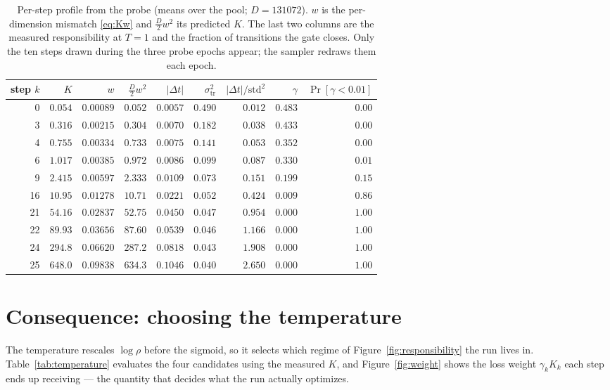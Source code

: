 \documentclass[11pt,a4paper]{article}
\newcommand{\dt}{\Delta t}
\newcommand{\str}{\sigma_{\mathrm{tr}}}
\begin{document}
\begin{table}[htbp]
\centering
\caption{Per-step profile from the probe (means over the pool; $D=131072$). $w$ is the
per-dimension mismatch \eqref{eq:Kw} and $\tfrac{D}{2}w^2$ its predicted $K$. The last two
columns are the measured responsibility at $T=1$ and the fraction of transitions the gate closes.
Only the ten steps drawn during the three probe epochs appear; the sampler redraws them each
epoch.}
\label{tab:profile}
\begin{tabular}{@{}rrrrrrrrr@{}}
\toprule
step $k$ & $K$ & $w$ & $\tfrac{D}{2}w^2$ & $\lvert\dt\rvert$ & $\str^2$
  & $\lvert\dt\rvert/\mathrm{std}^2$ & $\gamma$ & $\Pr[\gamma<0.01]$\\
\midrule
 0 & $0.054$ & $0.00089$ & $0.052$ & $0.0057$ & $0.490$ & $0.012$ & $0.483$ & $0.00$\\
 3 & $0.316$ & $0.00215$ & $0.304$ & $0.0070$ & $0.182$ & $0.038$ & $0.433$ & $0.00$\\
 4 & $0.755$ & $0.00334$ & $0.733$ & $0.0075$ & $0.141$ & $0.053$ & $0.352$ & $0.00$\\
 6 & $1.017$ & $0.00385$ & $0.972$ & $0.0086$ & $0.099$ & $0.087$ & $0.330$ & $0.01$\\
 9 & $2.415$ & $0.00597$ & $2.333$ & $0.0109$ & $0.073$ & $0.151$ & $0.199$ & $0.15$\\
16 & $10.95$ & $0.01278$ & $10.71$ & $0.0221$ & $0.052$ & $0.424$ & $0.009$ & $0.86$\\
21 & $54.16$ & $0.02837$ & $52.75$ & $0.0450$ & $0.047$ & $0.954$ & $0.000$ & $1.00$\\
22 & $89.93$ & $0.03656$ & $87.60$ & $0.0539$ & $0.046$ & $1.166$ & $0.000$ & $1.00$\\
24 & $294.8$ & $0.06620$ & $287.2$ & $0.0818$ & $0.043$ & $1.908$ & $0.000$ & $1.00$\\
25 & $648.0$ & $0.09838$ & $634.3$ & $0.1046$ & $0.040$ & $2.650$ & $0.000$ & $1.00$\\
\bottomrule
\end{tabular}
\end{table}

\section{Consequence: choosing the temperature}
\label{sec:temperature}

The temperature rescales $\log\rho$ before the sigmoid, so it selects which regime of
Figure~\ref{fig:responsibility} the run lives in. Table~\ref{tab:temperature} evaluates the four
candidates using the measured $K$, and Figure~\ref{fig:weight} shows the loss weight
$\gamma_k K_k$ each step ends up receiving --- the quantity that decides what the run actually
optimizes.
\end{document}
